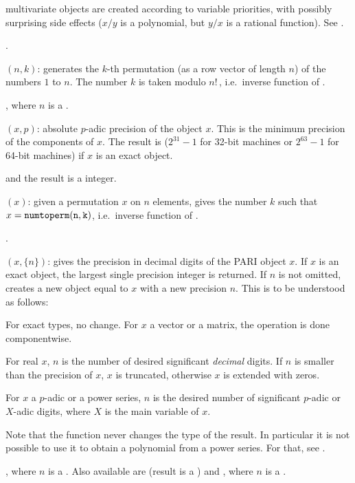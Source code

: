  multivariate objects are created according to variable
priorities, with possibly surprising side effects ($x/y$ is a polynomial, but
$y/x$ is a rational function). See .

.

$(n,k)$: generates the $k$-th permutation (as a
row vector of length $n$) of the numbers $1$ to $n$. The number $k$ is taken
modulo $n!\,$, i.e.~inverse function of .

, where $n$ is a .

$(x,p)$: absolute $p$-adic precision of the object $x$.
This is the minimum precision of the components of $x$. The result is
 ($2^{31}-1$ for 32-bit machines or $2^{63}-1$ for 64-bit
machines) if $x$ is an exact object.

 and the result is a 
integer.

$(x)$: given a permutation $x$ on $n$ elements,
gives the number $k$ such that $x={\tt numtoperm(n,k)}$, i.e.~inverse
function of .

.

$(x,\{n\})$: gives the precision in decimal digits of the
PARI object $x$. If $x$ is an exact object, the largest single precision
integer is returned. If $n$ is not omitted, creates a new object equal to $x$
with a new precision $n$. This is to be understood as follows:

For exact types, no change. For $x$ a vector or a matrix, the operation
is done componentwise.

For real $x$, $n$ is the number of desired significant \emph{decimal} digits.
If $n$ is smaller than the precision of $x$, $x$ is truncated, otherwise $x$
is extended with zeros.

For $x$ a $p$-adic or a power series, $n$ is the desired number of
significant $p$-adic or $X$-adic digits, where $X$ is the main variable of
$x$.

Note that the function  never changes the type of the result.
In particular it is not possible to use it to obtain a polynomial from a
power series. For that, see .

, where $n$ is a . Also available are
 (result is a ) and , where
$n$ is a .

